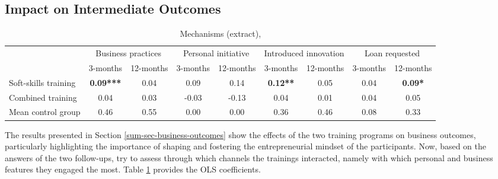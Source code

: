 \vspace{-5px}

\subsection{Impact on Intermediate Outcomes}
\label{sum-sec-intermediate-out}

\begin{table}
\centering
\caption{Mechanisms (extract), \cite{Ubfal2022}}
\label{sum-mechanisms}
\begin{adjustbox}{width=\textwidth}
\begin{tabular}{lcccccccc} 
\toprule
                     & \multicolumn{2}{c}{Business
  practices} & \multicolumn{2}{c}{Personal
  initiative} & \multicolumn{2}{c}{Introduced
  innovation} & \multicolumn{2}{c}{Loan requested}  \\
                     & 3-months         & 12-months             & 3-months & 12-months                      & 3-months        & 12-months                 & 3-months & 12-months                \\ 
\hline
Soft-skills training & \textbf{0.09***} & 0.04                  & 0.09     & 0.14                           & \textbf{0.12**} & 0.05                      & 0.04     & \textbf{0.09*}           \\
Combined training    & 0.04             & 0.03                  & -0.03    & -0.13                          & 0.04            & 0.01                      & 0.04     & 0.05                     \\
Mean control group                     & 0.46             & 0.55                  & 0.00     & 0.00                           & 0.36            & 0.46                      & 0.08     & 0.33                     \\
\bottomrule
\end{tabular}
\end{adjustbox}
\end{table}

The results presented in Section \ref{sum-sec-business-outcomes} show the effects of the two training programs on business outcomes, particularly highlighting the importance of shaping and fostering the entrepreneurial mindset of the participants. Now, based on the answers of the two follow-ups, \cite{Ubfal2022} try to assess through which channels the trainings interacted, namely with which personal and business features they engaged the most. Table \ref{sum-mechanisms} provides the OLS coefficients.

